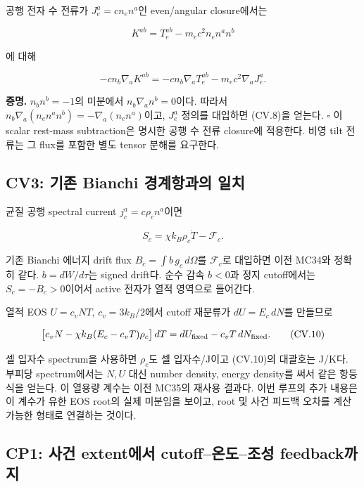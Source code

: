 \documentclass[11pt,a4paper]{article}
\begin{document}
공행 전자 수 전류가 \(J_e^a=c n_e n^a\)인 even/angular closure에서는

\[
K^{ab}=T_e^{ab}-m_ec^2 n_e n^an^b
\]

에 대해

\[
\boxed{-c n_b\nabla_aK^{ab}
=-c n_b\nabla_aT_e^{ab}-m_ec^2\nabla_aJ_e^a.}
\tag{CV.8}
\]

\textbf{증명.} \(n_bn^b=-1\)의 미분에서 \(n_b\nabla_an^b=0\)이다. 따라서 \(n_b\nabla_a(n_en^an^b)=-\nabla_a(n_en^a)\)이고, \(J_e^a\) 정의를 대입하면 (CV.8)을 얻는다. \(\square\) 이 scalar rest-mass subtraction은 명시한 공행 수 전류 closure에 적용한다. 비영 tilt 전류는 그 flux를 포함한 별도 tensor 분해를 요구한다.

\hypertarget{cv3-uxae30uxc874-bianchi-uxacbduxacc4uxd56duxacfcuxc758-uxc77cuxce58}{%
\subsection{CV3: 기존 Bianchi 경계항과의 일치}\label{cv3-uxae30uxc874-bianchi-uxacbduxacc4uxd56duxacfcuxc758-uxc77cuxce58}}

균질 공행 spectral current \(j_c^a=c\rho_c n^a\)이면

\[
S_c=\chi k_B\rho_c\dot T-\mathcal F_c.
\tag{CV.9}
\]

기존 Bianchi 에너지 drift flux \(B_c=\int b\,g_c\,d\Omega\)를 \(\mathcal F_c\)로 대입하면 이전 MC34와 정확히 같다. \(b=dW/d\tau\)는 signed drift다. 순수 감속 \(b<0\)과 정지 cutoff에서는 \(S_c=-B_c>0\)이어서 active 전자가 열적 영역으로 들어간다.

열적 EOS \(U=c_vNT\), \(c_v=3k_B/2\)에서 cutoff 재분류가 \(dU=E_c\,dN\)를 만들므로

\[
\big[c_vN-\chi k_B(E_c-c_vT)\rho_c\big]\,dT
=dU_{\rm fixed}-c_vT\,dN_{\rm fixed}.
\tag{CV.10}
\]

셀 입자수 spectrum을 사용하면 \(\rho_c\)도 셀 입자수/J이고 (CV.10)의 대괄호는 J/K다. 부피당 spectrum에서는 \(N,U\) 대신 number density, energy density를 써서 같은 항등식을 얻는다. 이 열용량 계수는 이전 MC35의 재사용 결과다. 이번 루프의 추가 내용은 이 계수가 유한 EOS root의 실제 미분임을 보이고, root 및 사건 피드백 오차를 계산 가능한 형태로 연결하는 것이다.

\hypertarget{cp1-uxc0acuxac74-extentuxc5d0uxc11c-cutoffuxc628uxb3c4uxc870uxc131-feedbackuxae4cuxc9c0}{%
\subsection{CP1: 사건 extent에서 cutoff--온도--조성 feedback까지}\label{cp1-uxc0acuxac74-extentuxc5d0uxc11c-cutoffuxc628uxb3c4uxc870uxc131-feedbackuxae4cuxc9c0}}
\end{document}
